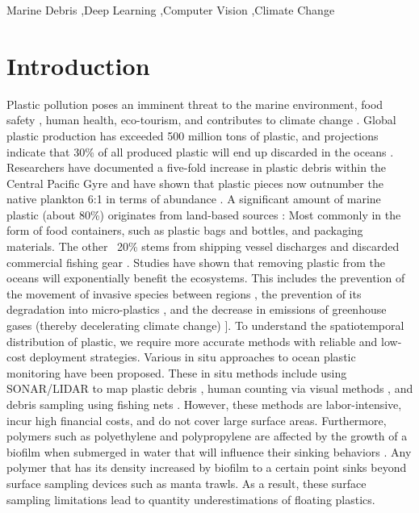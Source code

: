 \documentclass[a4paper,fleqn]{cas-dc}
\begin{document}
\begin{keywords}
Marine Debris \sep Deep Learning \sep Computer Vision \sep Climate Change
\end{keywords}


\maketitle

\section{Introduction}

Plastic pollution poses an imminent threat to the marine environment, food safety \cite{BARBOZA2018336}, human health, eco-tourism, and contributes to climate change \cite{schmidt2017export}. Global plastic production has exceeded 500 million tons of plastic, and projections indicate that 30\% of all produced plastic will end up discarded in the oceans \cite{nollkaemper1994land} \cite{epa2014municipal}. Researchers have documented a five-fold increase in plastic debris within the Central Pacific Gyre and have shown that plastic pieces now outnumber the native plankton 6:1 in terms of abundance \cite{clapp2012rising}.
A significant amount of marine plastic (about 80\%) originates from land-based sources \cite{Windom_1992}: Most commonly in the form of food containers, such as plastic bags and bottles, and packaging materials. The other ~20\% stems from shipping vessel discharges and discarded commercial fishing gear \cite{Windom_1992}. 
Studies have shown that removing plastic from the oceans will exponentially benefit the ecosystems. This includes the prevention of the movement of invasive species between regions \cite{carlton2017tsunami}, the prevention of its degradation into micro-plastics \cite{andrady2011microplastics}, and the decrease in emissions of greenhouse gases (thereby decelerating climate change) \cite{royer2018production}]. 
To understand the spatiotemporal distribution of plastic, we require more accurate methods with reliable and low-cost deployment strategies. Various in situ approaches to ocean plastic monitoring have been proposed. These in situ methods include using SONAR/LIDAR to map plastic debris \cite{valdenegrotoro2019deep}, human counting via visual methods \cite{van2018methodology}, and debris sampling using fishing nets \cite{rech2014rivers}. However, these methods are labor-intensive, incur high financial costs, and do not cover large surface areas. 
Furthermore, polymers such as polyethylene and polypropylene are affected by the growth of a biofilm when submerged in water that will influence their sinking behaviors \cite{Kaiser_Kowalski_Waniek_2017}. Any polymer that has its density increased by biofilm to a certain point sinks beyond surface sampling devices such as manta trawls. As a result, these surface sampling limitations lead to quantity underestimations of floating plastics.
\end{document}
